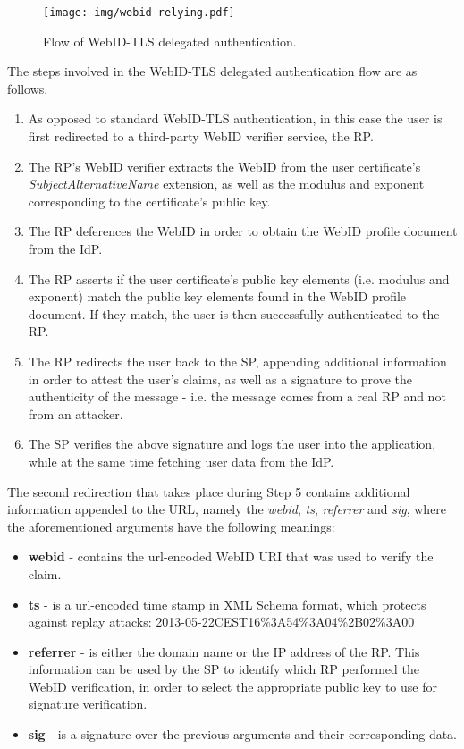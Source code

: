 \begin{figure}[h]
  \begin{center}
    \texttt{[image: img/webid-relying.pdf]}
        \caption{Flow of WebID-TLS delegated authentication.}
        \label{fig:webid-relying}
  \end{center}
\end{figure}

The steps involved in the WebID-TLS delegated authentication flow are as follows.

\begin{enumerate}
\item As opposed to standard WebID-TLS authentication, in this case the user is first redirected to a third-party WebID verifier service, the RP.
\item The RP's WebID verifier extracts the WebID from the user certificate's \textit{SubjectAlternativeName} extension, as well as the modulus and exponent corresponding to the certificate's public key.
\item The RP deferences the WebID in order to obtain the WebID profile document from the IdP.
\item The RP asserts if the user certificate's public key elements (i.e. modulus and exponent) match the public key elements found in the WebID profile document. If they match, the user is then successfully authenticated to the RP.
\item The RP redirects the user back to the SP, appending additional information in order to attest the user's claims, as well as a signature to prove the authenticity of the message - i.e. the message comes from a real RP and not from an attacker.
\item The SP verifies the above signature and logs the user into the application, while at the same time fetching user data from the IdP.
\end{enumerate}

The second redirection that takes place during Step 5 contains additional information appended to the URL, namely the \textit{webid}, \textit{ts}, \textit{referrer} and \textit{sig}, where the aforementioned arguments have the following meanings:

\begin{itemize}
\item \textbf{webid} - contains the url-encoded WebID URI that was used to verify the claim.
\item \textbf{ts} - is a url-encoded time stamp in XML Schema format, which protects against replay attacks:  2013-05-22CEST16\%3A54\%3A04\%2B02\%3A00
\item \textbf{referrer} - is either the domain name or the IP address of the RP. This information can be used by the SP to identify which RP performed the WebID verification, in order to select the appropriate public key to use for signature verification.
\item \textbf{sig} - is a signature over the previous arguments and their corresponding data.
\end{itemize}

